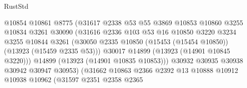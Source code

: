 \begin{lexlean}{RustStd}
\begin{coremodule}
                                      @10854
                                      @10861
                                      @8775
                                      (@31617
                                        @2338
                                        @53
                                        @55
                                        @3869
                                        @10853
                                        @10860
                                        @3255
                                        @10834
                                        @3261
                                        @30090
                                        (@31616
                                          @2336
                                          @103
                                          @53
                                          @16
                                          @10850
                                          @3220
                                          @3234
                                          @3255
                                          @10844
                                          @3261
                                          (@30050
                                            @2335
                                            @10850
                                            (@15453 (@15454 @10850))
                                            (@13923 (@15459 @2335 @53)))
                                          @30017
                                          @14899
                                          (@13923 (@14901 @10845 @3220)))
                                        @14899
                                        (@13923 (@14901 @10835 @10853)))
                                      @30932
                                      @30935
                                      @30938
                                      @30942
                                      @30947
                                      @30953)
                                    (@31662
                                      @10863
                                      @2366
                                      @2392
                                      @13
                                      @10888
                                      @10912
                                      @10938
                                      @10962
                                      (@31597
                                        @2351
                                        @2358
                                        @2365

\end{coremodule}
\end{lexlean}
